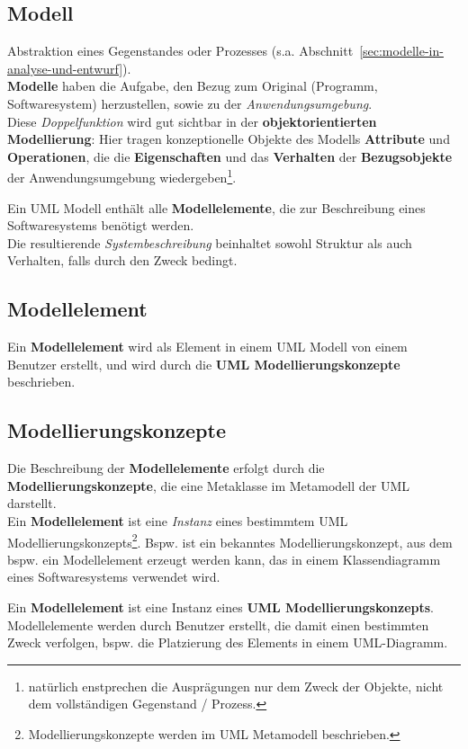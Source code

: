\subsection*{Modell}
Abstraktion eines Gegenstandes oder Prozesses (s.a. Abschnitt~\ref{sec:modelle-in-analyse-und-entwurf}).\\
\textbf{Modelle} haben die Aufgabe, den Bezug zum Original (Programm, Softwaresystem) herzustellen, sowie zu der \textit{Anwendungsumgebung}.\\

\noindent
Diese \textit{Doppelfunktion} wird gut sichtbar in der \textbf{objektorientierten Modellierung}: Hier tragen konzeptionelle Objekte des Modells \textbf{Attribute} und \textbf{Operationen}, die die \textbf{Eigenschaften} und das \textbf{Verhalten} der \textbf{Bezugsobjekte} der Anwendungsumgebung wiedergeben\footnote{
    natürlich enstprechen die Ausprägungen nur dem Zweck der Objekte, nicht dem vollständigen Gegenstand / Prozess.
}.

\noindent
Ein UML Modell enthält alle \textbf{Modellelemente}, die zur Beschreibung eines Softwaresystems benötigt werden.\\
Die resultierende \textit{Systembeschreibung} beinhaltet sowohl Struktur als auch Verhalten, falls durch den Zweck bedingt.

\subsection*{Modellelement}
Ein \textbf{Modellelement} wird als Element in einem UML Modell von einem Benutzer erstellt, und wird durch die \textbf{UML Modellierungskonzepte} beschrieben.

\subsection*{Modellierungskonzepte}
Die Beschreibung der \textbf{Modellelemente} erfolgt durch die \textbf{Modellierungskonzepte}, die eine Metaklasse im Metamodell der UML darstellt.\\
Ein \textbf{Modellelement} ist eine \textit{Instanz} eines bestimmtem UML Modellierungskonzepts\footnote{
Modellierungskonzepte werden im UML Metamodell beschrieben.
}.
Bspw. ist  ein bekanntes Modellierungskonzept, aus dem bspw. ein Modellelement  erzeugt werden kann, das in einem Klassendiagramm eines Softwaresystems verwendet wird.

\vspace{2mm}
\begin{tcolorbox}
Ein \textbf{Modellelement} ist eine Instanz eines \textbf{UML Modellierungskonzepts}.\\
    Modellelemente werden durch Benutzer erstellt, die damit einen bestimmten Zweck verfolgen, {bspw.} die Platzierung des Elements in einem UML-Diagramm.
\end{tcolorbox}
\vspace{2mm}


